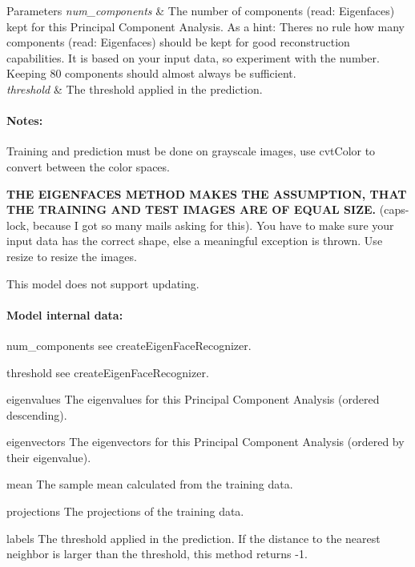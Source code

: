 \begin{DoxyParams}{Parameters}
{\em num\+\_\+components} & The number of components (read\+: Eigenfaces) kept for this Principal Component Analysis. As a hint\+: There\textquotesingle{}s no rule how many components (read\+: Eigenfaces) should be kept for good reconstruction capabilities. It is based on your input data, so experiment with the number. Keeping 80 components should almost always be sufficient. \\
\hline
{\em threshold} & The threshold applied in the prediction. \\
\hline
\end{DoxyParams}
\paragraph*{Notes\+:}


\begin{DoxyItemize}
\item Training and prediction must be done on grayscale images, use cvt\+Color to convert between the color spaces.
\item {\bfseries T\+HE E\+I\+G\+E\+N\+F\+A\+C\+ES M\+E\+T\+H\+OD M\+A\+K\+ES T\+HE A\+S\+S\+U\+M\+P\+T\+I\+ON, T\+H\+AT T\+HE T\+R\+A\+I\+N\+I\+NG A\+ND T\+E\+ST I\+M\+A\+G\+ES A\+RE OF E\+Q\+U\+AL S\+I\+ZE.} (caps-\/lock, because I got so many mails asking for this). You have to make sure your input data has the correct shape, else a meaningful exception is thrown. Use resize to resize the images.
\item This model does not support updating. 
\end{DoxyItemize}

\paragraph*{Model internal data\+:}


\begin{DoxyItemize}
\item num\+\_\+components see create\+Eigen\+Face\+Recognizer.
\item threshold see create\+Eigen\+Face\+Recognizer.
\item eigenvalues The eigenvalues for this Principal Component Analysis (ordered descending).
\item eigenvectors The eigenvectors for this Principal Component Analysis (ordered by their eigenvalue).
\item mean The sample mean calculated from the training data.
\item projections The projections of the training data.
\item labels The threshold applied in the prediction. If the distance to the nearest neighbor is larger than the threshold, this method returns -\/1. 
\end{DoxyItemize}\mbox{\label{group__face_ga80a98f353dd2ef661444e0d79bbe9daf}} 

